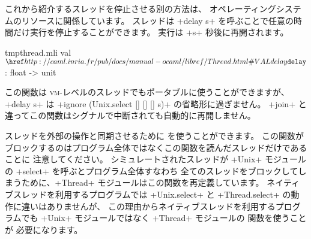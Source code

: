 これから紹介するスレッドを停止させる別の方法は、
オペレーティングシステムのリソースに関係しています。
スレッドは \ml+delay s+ を呼ぶことで任意の時間だけ実行を停止することができます。
実行は \ml+s+ 秒後に再開されます。
%
\begin{listingcodefile}{tmpthread.mli}
val $\indexlibvalue{Thread}{delay}$ : float -> unit
\end{listingcodefile}
%
この関数は \textsc{vm}-レベルのスレッドでもポータブルに使うことができますが、
\ml+delay s+ は \ml+ignore (Unix.select [] [] [] s)+ の省略形に過ぎません。
\ml+join+ と違ってこの関数はシグナルで中断されても自動的に再開しません。


スレッドを外部の操作と同期させるために  を使うことができます。
この関数がブロックするのはプログラム全体ではなくこの関数を読んだスレッドだけであることに
注意してください。
シミュレートされたスレッドが \ml+Unix+ モジュールの \ml+select+ を呼ぶとプログラム全体すなわち
全てのスレッドをブロックしてしまうために、\ml+Thread+ モジュールはこの関数を再定義しています。
ネイティブスレッドを利用するプログラムでは \ml+Unix.select+ と \ml+Thread.select+ の動作に違いはありませんが、
この理由からネイティブスレッドを利用するプログラムでも \ml+Unix+ モジュールではなく \ml+Thread+ モジュールの  関数を使うことが
必要になります。

